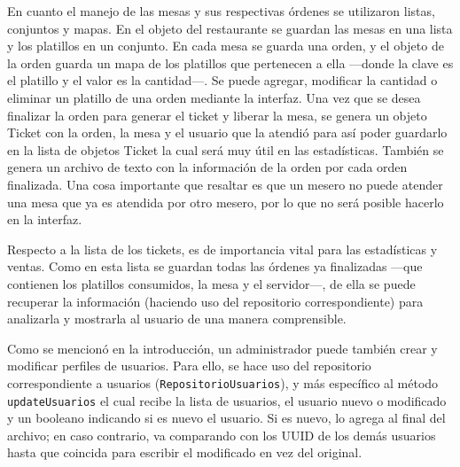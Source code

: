En cuanto el manejo de las mesas y sus respectivas órdenes se utilizaron listas, conjuntos y mapas. En el
objeto del restaurante se guardan las mesas en una lista y los platillos en un conjunto. En cada mesa se
guarda una orden, y el objeto de la orden guarda un mapa de los platillos que pertenecen a ella ---donde la 
clave es el platillo y el valor es la cantidad---. Se puede agregar, modificar la cantidad o eliminar un platillo
de una orden mediante la interfaz. Una vez que se desea finalizar la orden para generar el ticket y liberar la mesa,
se genera un objeto Ticket con la orden, la mesa y el usuario que la atendió para así poder guardarlo en la lista de
objetos Ticket la cual será muy útil en las estadísticas. También se genera un archivo de texto con la información de
la orden por cada orden finalizada. Una cosa importante que resaltar es que un mesero no puede atender una mesa que
ya es atendida por otro mesero, por lo que no será posible hacerlo en la interfaz.

Respecto a la lista de los tickets, es de importancia vital para las estadísticas y ventas. Como en esta lista se guardan
todas las órdenes ya finalizadas ---que contienen los platillos consumidos, la mesa y el servidor---, de ella se puede
recuperar la información (haciendo uso del repositorio correspondiente) para analizarla y mostrarla al usuario de una manera
comprensible.

Como se mencionó en la introducción, un administrador puede también crear y modificar perfiles de usuarios. Para ello, se hace
uso del repositorio correspondiente a usuarios (\texttt{RepositorioUsuarios}), y más específico al método \texttt{updateUsuarios}
el cual recibe la lista de usuarios, el usuario nuevo o modificado y un booleano indicando si es nuevo el usuario. Si es nuevo,
lo agrega al final del archivo; en caso contrario, va comparando con los UUID de los demás usuarios hasta que coincida para
escribir el modificado en vez del original.
\pagebreak